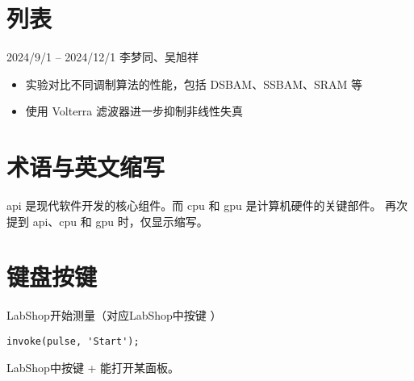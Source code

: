 \section{列表}
 \hfill {\color{njuviolet}\faCalendar*} 2024/9/1 -- 2024/12/1 \hfill {\color{njuviolet}\faUsers} 李梦同、吴旭祥
\begin{itemize}
    \item 实验对比不同调制算法的性能，包括 DSBAM、SSBAM、SRAM 等
    \item 使用 Volterra 滤波器进一步抑制非线性失真
\end{itemize}


\section{术语与英文缩写}
\gls{api} 是现代软件开发的核心组件。而 \gls{cpu} 和 \gls{gpu} 是计算机硬件的关键部件。
再次提到 \gls{api}、\gls{cpu} 和 \gls{gpu} 时，仅显示缩写。

\section{键盘按键}

LabShop开始测量（对应LabShop中按键 ）
\begin{lstlisting}[style=matlab-custom]
invoke(pulse, 'Start');
\end{lstlisting}

LabShop中按键  +  能打开某面板。